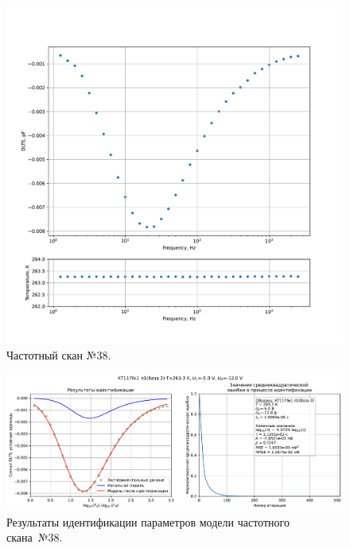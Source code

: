 \begin{figure}[!ht]
    \centering
    \includegraphics[width=1\textwidth]{../plots/КТ117№1_п1(база 2)_2500Гц-1Гц_1пФ_-10С_-5В-12В_100мВ_20мкс_шаг_0,1.pdf}
    \caption{Частотный скан №38.}
    \label{pic:frequency_scan_38}
\end{figure}

\begin{figure}[!ht]
    \centering
    \includegraphics[width=1\textwidth]{../plots/КТ117№1_п1(база 2)_2500Гц-1Гц_1пФ_-10С_-5В-12В_100мВ_20мкс_шаг_0,1_model.pdf}
    \caption{Результаты идентификации параметров модели частотного скана~№38.}
    \label{pic:frequency_scan_model38}
\end{figure}

\pagebreak


